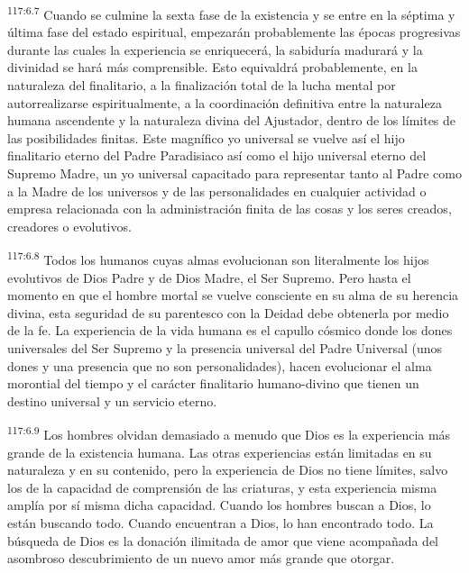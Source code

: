 \documentclass[twoside, 11pt]{book}
\begin{document}
\par
\textsuperscript{117:6.7} Cuando se culmine la sexta fase de la existencia y se entre en la séptima y última fase del estado espiritual, empezarán probablemente las épocas progresivas durante las cuales la experiencia se enriquecerá, la sabiduría madurará y la divinidad se hará más comprensible. Esto equivaldrá probablemente, en la naturaleza del finalitario, a la finalización total de la lucha mental por autorrealizarse espiritualmente, a la coordinación definitiva entre la naturaleza humana ascendente y la naturaleza divina del Ajustador, dentro de los límites de las posibilidades finitas. Este magnífico yo universal se vuelve así el hijo finalitario eterno del Padre Paradisiaco así como el hijo universal eterno del Supremo Madre, un yo universal capacitado para representar tanto al Padre como a la Madre de los universos y de las personalidades en cualquier actividad o empresa relacionada con la administración finita de las cosas y los seres creados, creadores o evolutivos.

\par
\textsuperscript{117:6.8} Todos los humanos cuyas almas evolucionan son literalmente los hijos evolutivos de Dios Padre y de Dios Madre, el Ser Supremo. Pero hasta el momento en que el hombre mortal se vuelve consciente en su alma de su herencia divina, esta seguridad de su parentesco con la Deidad debe obtenerla por medio de la fe. La experiencia de la vida humana es el capullo cósmico donde los dones universales del Ser Supremo y la presencia universal del Padre Universal (unos dones y una presencia que no son personalidades), hacen evolucionar el alma morontial del tiempo y el carácter finalitario humano-divino que tienen un destino universal y un servicio eterno.

\par
\textsuperscript{117:6.9} Los hombres olvidan demasiado a menudo que Dios es la experiencia más grande de la existencia humana. Las otras experiencias están limitadas en su naturaleza y en su contenido, pero la experiencia de Dios no tiene límites, salvo los de la capacidad de comprensión de las criaturas, y esta experiencia misma amplía por sí misma dicha capacidad. Cuando los hombres buscan a Dios, lo están buscando todo. Cuando encuentran a Dios, lo han encontrado todo. La búsqueda de Dios es la donación ilimitada de amor que viene acompañada del asombroso descubrimiento de un nuevo amor más grande que otorgar.
\end{document}
